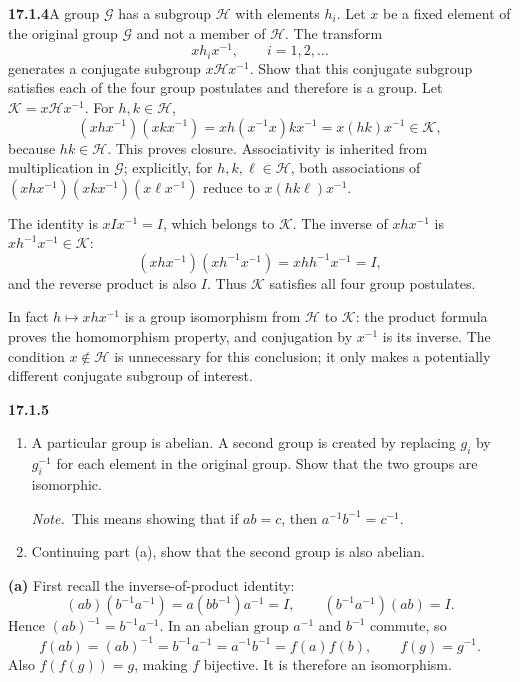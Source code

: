 \par\bigskip
\noindent\textbf{17.1.4}\quad A group $\mathcal{G}$ has a subgroup
$\mathcal{H}$ with elements $h_{i}$. Let $x$ be a fixed element of
the original group $\mathcal{G}$ and not a member of $\mathcal{H}$.
The transform
\[
xh_{i}x^{-1},\qquad i=1,2,\ldots
\]
generates a conjugate subgroup $x\mathcal{H}x^{-1}$. Show that this
conjugate subgroup satisfies each of the four group postulates and
therefore is a group.
\solution
Let $\mathcal K=x\mathcal Hx^{-1}$.
For $h,k\in\mathcal H$,
\[
(xhx^{-1})(xkx^{-1})
=xh(x^{-1}x)kx^{-1}=x(hk)x^{-1}\in\mathcal K,
\]
because $hk\in\mathcal H$. This proves closure.
Associativity is inherited from multiplication in $\mathcal G$;
explicitly, for $h,k,\ell\in\mathcal H$, both associations of
$(xhx^{-1})(xkx^{-1})(x\ell x^{-1})$ reduce to $x(hk\ell)x^{-1}$.

The identity is $xIx^{-1}=I$, which belongs to $\mathcal K$.
The inverse of $xhx^{-1}$ is $xh^{-1}x^{-1}\in\mathcal K$:
\[
(xhx^{-1})(xh^{-1}x^{-1})=xhh^{-1}x^{-1}=I,
\]
and the reverse product is also $I$.
Thus $\mathcal K$ satisfies all four group postulates.

In fact $h\mapsto xhx^{-1}$ is a group isomorphism from
$\mathcal H$ to $\mathcal K$: the product formula proves the
homomorphism property, and conjugation by $x^{-1}$ is its inverse.
The condition $x\notin\mathcal H$ is unnecessary for this conclusion;
it only makes a potentially different conjugate subgroup of interest.

\par\bigskip
\noindent\textbf{17.1.5}
\begin{enumerate}
\item[(a)] A particular group is abelian. A second group is created
by replacing $g_{i}$ by $g_{i}^{-1}$ for each element in the original
group. Show that the two groups are isomorphic.
\par\emph{Note.}~This means showing that if $ab=c$, then
$a^{-1}b^{-1}=c^{-1}$.
\item[(b)] Continuing part (a), show that the second group is also
abelian.
\end{enumerate}
\solution
\textbf{(a)} First recall the inverse-of-product identity:
\[
(ab)(b^{-1}a^{-1})=a(bb^{-1})a^{-1}=I,
\qquad
(b^{-1}a^{-1})(ab)=I.
\]
Hence $(ab)^{-1}=b^{-1}a^{-1}$.
In an abelian group $a^{-1}$ and $b^{-1}$ commute, so
\[
f(ab)=(ab)^{-1}=b^{-1}a^{-1}=a^{-1}b^{-1}=f(a)f(b),
\qquad f(g)=g^{-1}.
\]
Also $f(f(g))=g$, making $f$ bijective. It is therefore an isomorphism.


